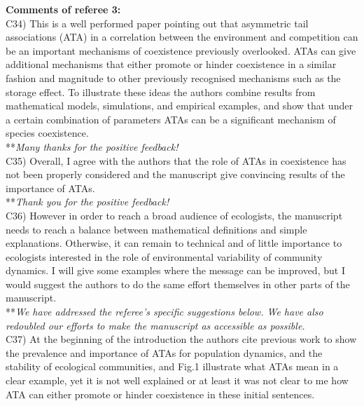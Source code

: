 \documentclass[letterpaper,11pt]{article}
\begin{document}
\noindent \textbf{Comments of referee 3:} \\
  
\noindent C34) This is a well performed paper pointing out that asymmetric tail associations (ATA) in a correlation between the environment and competition can be an important mechanisms of coexistence previously overlooked. ATAs can give additional mechanisms that either promote or hinder coexistence in a similar fashion and magnitude to other previously recognised mechanisms such as the storage effect. To illustrate these ideas the authors combine results from mathematical models, simulations, and empirical examples, and show that under a certain combination of parameters ATAs can be a significant mechanism of species coexistence. \\

\noindent ***\emph{Many thanks for the positive feedback!} \\

\noindent C35) Overall, I agree with the authors that the role of ATAs in coexistence has not been properly considered and the manuscript give convincing results of the importance of ATAs. \\

\noindent ***\emph{Thank you for the positive feedback!} \\

\noindent C36) However in order to reach a broad audience of ecologists, the manuscript needs to reach a balance between mathematical definitions and simple explanations. Otherwise, it can remain to technical and of little importance to ecologists interested in the role of environmental variability of community dynamics. I will give some examples where the message can be improved, but I would suggest the authors to do the same effort themselves in other parts of the manuscript. \\

\noindent ***\emph{We have addressed the referee's specific suggestions below. We have also redoubled our
efforts to make the manuscript as accessible as possible.} \\

\noindent C37) At the beginning of the introduction the authors cite previous work to show the prevalence and importance of ATAs for population dynamics, and the stability of ecological communities, and Fig.1 illustrate what ATAs mean in a clear example, yet it is not well explained or at least it was not clear to me how ATA can either promote or hinder coexistence in these initial sentences. \\
\end{document}
